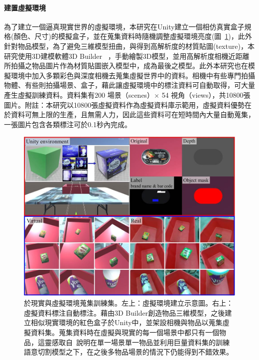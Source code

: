 \paragraph{建置虛擬環境}
為了建立一個逼真現實世界的虛擬環境，本研究在Unity建立一個相仿真實盒子規格(顏色、尺寸)的模擬盒子，並在蒐集資料時隨機調整虛擬環境亮度(圖~\ref{figure:benchmark-dataset})，此外針對物品模型，為了避免三維模型扭曲，與得到高解析度的材質貼圖(texture)，本研究使用3D建模軟體3D Builder ~\cite{3DBuilder}，手動繪製3D模型，並用高解析度相機近距離所拍攝之物品圖片作為材質貼圖嵌入模型中，成為最後之模型。此外本研究也在模擬環境中加入多顆彩色與深度相機去蒐集虛擬世界中的資料。相機中有些專門拍攝物體、有些則拍攝場景、盒子，藉此讓虛擬環境中的標注資料可自動取得，可大量產生虛擬訓練資料。資料集有200 場景（scenes）$\times$ 54 視角（views），共10800張圖片。附註：本研究以10800張虛擬資料作為虛擬資料庫示範用，虛擬資料優勢在於資料可無上限的生產，且無需人力，因此這些資料可在短時間內大量自動蒐集，一張圖片包含各類標注可於0.1秒內完成。

\begin{figure}[H]
	\centering
	\includegraphics[height=!, width=1.0\linewidth, keepaspectratio=true]
	{./figures/real_and_vir_environment.jpg}
  \caption{於現實與虛擬環境蒐集訓練集。左上：虛擬環境建立示意圖。右上：虛擬資料標注自動標注。藉由3D Builder創造物品三維模型，之後建立相似現實環境的紅色盒子於Unity中，並架設相機與物品以蒐集虛擬資料集。蒐集資料時在虛擬與現實的每一個場景中都只有一個物品，這靈感取自~\cite{zeng2016multi}說明在單一場景單一物品並利用巨量資料集的訓練語意切割模型之下，在之後多物品場景的情況下仍能得到不錯效果。}
  \label{figure:benchmark-dataset}
\end{figure}

